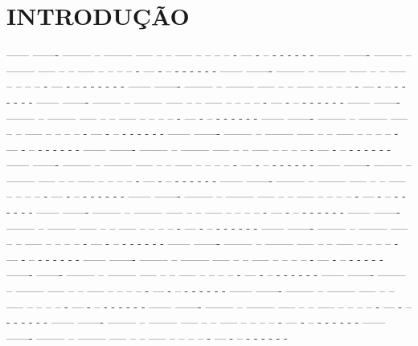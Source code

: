 \chapter[INTRODUÇÃO]{INTRODUÇÃO} %

------ ------- -------- --  -------- ----- -- -- ----- -- -- --  -- - --- - -- - - - - - -
------ ------- -------- --  -------- ----- -- -- ----- -- -- --  -- - --- - -- - - - - - -
------ ------- -------- --  -------- ----- -- -- ----- -- -- --  -- - --- - -- - - - - - -
------ ------- -------- --  -------- ----- -- -- ----- -- -- --  -- - --- - -- - - - - - -
------ ------- -------- --  -------- ----- -- -- ----- -- -- --  -- - --- - -- - - - - - -
------ ------- -------- --  -------- ----- -- -- ----- -- -- --  -- - --- - -- - - - - - -
------ ------- -------- --  -------- ----- -- -- ----- -- -- --  -- - --- - -- - - - - - -
------ ------- -------- --  -------- ----- -- -- ----- -- -- --  -- - --- - -- - - - - - -
------ ------- -------- --  -------- ----- -- -- ----- -- -- --  -- - --- - -- - - - - - -
------ ------- -------- --  -------- ----- -- -- ----- -- -- --  -- - --- - -- - - - - - -
------ ------- -------- --  -------- ----- -- -- ----- -- -- --  -- - --- - -- - - - - - -
------ ------- -------- --  -------- ----- -- -- ----- -- -- --  -- - --- - -- - - - - - -
------ ------- -------- --  -------- ----- -- -- ----- -- -- --  -- - --- - -- - - - - - -
------ ------- -------- --  -------- ----- -- -- ----- -- -- --  -- - --- - -- - - - - - -
------ ------- -------- --  -------- ----- -- -- ----- -- -- --  -- - --- - -- - - - - - -
------ ------- -------- --  -------- ----- -- -- ----- -- -- --  -- - --- - -- - - - - - -
------ ------- -------- --  -------- ----- -- -- ----- -- -- --  -- - --- - -- - - - - - -
------ ------- -------- --  -------- ----- -- -- ----- -- -- --  -- - --- - -- - - - - - ------- ------- -------- --  -------- ----- -- -- ----- -- -- --  -- - --- - -- - - - - - -
------ ------- -------- --  -------- ----- -- -- ----- -- -- --  -- - --- - -- - - - - - -
------ ------- -------- --  -------- ----- -- -- ----- -- -- --  -- - --- - -- - - - - - -
------ ------- -------- --  -------- ----- -- -- ----- -- -- --  -- - --- - -- - - - - - -
------ ------- -------- --  -------- ----- -- -- ----- -- -- --  -- - --- - -- - - - - - -
------ ------- -------- --  -------- ----- -- -- ----- -- -- --  -- - --- - -- - - - - - -